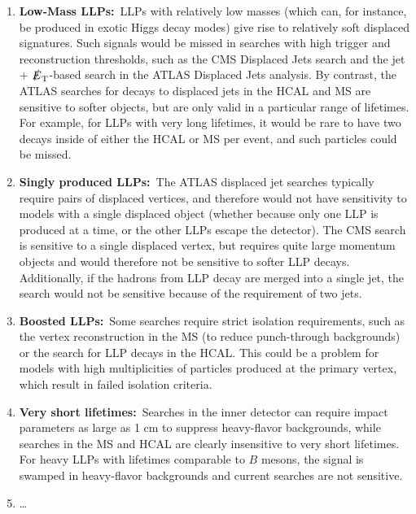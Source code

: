 \begin{enumerate}

\item {\bf Low-Mass LLPs:}~LLPs with relatively low masses (which can, for instance, be produced in exotic Higgs decay modes) give rise to relatively soft displaced signatures. Such signals would be missed in searches with high trigger and reconstruction thresholds, such as the CMS Displaced Jets search and the jet + $\slashed{E}_{\rm T}$-based search in the ATLAS Displaced Jets analysis. By contrast, the ATLAS searches for decays to displaced jets in the HCAL and MS are sensitive to softer objects, but are only valid in a particular range of lifetimes. For example, for LLPs with very long lifetimes, it would be rare to have two decays inside of either the HCAL or MS per event, and such particles could be missed.

\item {\bf Singly produced LLPs:}~The ATLAS displaced jet searches typically require pairs of displaced vertices, and therefore would not have sensitivity to models with a single displaced object (whether because only one LLP is produced at a time, or the other LLPs escape the detector). The CMS search is sensitive to a single displaced vertex, but requires quite large momentum objects and would therefore not be sensitive to softer LLP decays. Additionally, if the hadrons from LLP decay are merged into a single jet, the search would not be sensitive because of the requirement of two jets.

\item {\bf Boosted LLPs:}~Some searches require strict isolation requirements, such as the vertex reconstruction in the MS (to reduce punch-through backgrounds) or the search for LLP decays in the HCAL. This could be a problem for models with high multiplicities of particles produced at the primary vertex, which result in failed isolation criteria.

\item {\bf Very short lifetimes:}~Searches in the inner detector can require impact parameters as large as 1 cm to suppress heavy-flavor backgrounds, while searches in the MS and HCAL are clearly insensitive to very short lifetimes. For heavy LLPs with lifetimes comparable to $B$ mesons, the signal is swamped in heavy-flavor backgrounds and current searches are not sensitive.


\item \ldots

\end{enumerate}

